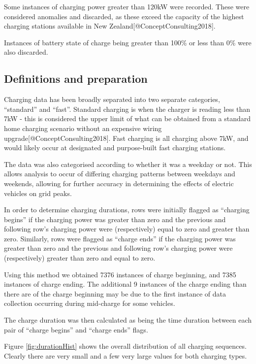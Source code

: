 \documentclass[]{article}
\begin{document}
Some instances of charging power greater than 120kW were recorded. These
were considered anomalies and discarded, as these exceed the capacity of
the highest charging stations available in New
Zealand{[}@ConceptConsulting2018{]}.

Instances of battery state of charge being greater than 100\% or less
than 0\% were also discarded.

\subsection{Definitions and preparation}\label{cleaning}

Charging data has been broadly separated into two separate categories,
``standard'' and ``fast''. Standard charging is when the charger is
reading less than 7kW - this is considered the upper limit of what can
be obtained from a standard home charging scenario without an expensive
wiring upgrade{[}@ConceptConsulting2018{]}. Fast charging is all
charging above 7kW, and would likely occur at designated and
purpose-built fast charging stations.

The data was also categorised according to whether it was a weekday or
not. This allows analysis to occur of differing charging patterns
between weekdays and weekends, allowing for further accuracy in
determining the effects of electric vehicles on grid peaks.

In order to determine charging durations, rows were initially flagged as
``charging begins'' if the charging power was greater than zero and the
previous and following row's charging power were (respectively) equal to
zero and greater than zero. Similarly, rows were flagged as ``charge
ends'' if the charging power was greater than zero and the previous and
following row's charging power were (respectively) greater than zero and
equal to zero.

Using this method we obtained 7376 instances of charge beginning, and
7385 instances of charge ending. The additional 9 instances of the
charge ending than there are of the charge beginning may be due to the
first instance of data collection occurring during mid-charge for some
vehicles.

The charge duration was then calculated as being the time duration
between each pair of ``charge begins'' and ``charge ends'' flags.

Figure \ref{fig:durationHist} shows the overall distribution of all
charging sequences. Clearly there are very small and a few very large
values for both charging types.
\end{document}
